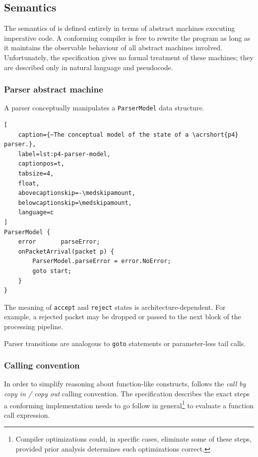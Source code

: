 \subsection{Semantics}

The semantics of \pfs is defined entirely in terms of abstract machines
executing imperative code. A conforming compiler is free to rewrite the \pfs
program as long as it maintains the observable behaviour of all abstract
machines involved. Unfortunately, the specification gives no formal treatment
of these machines; they are described only in natural language and pseudocode.



\subsubsection*{Parser abstract machine}

A parser conceptually manipulates a \texttt{ParserModel} data structure.

\begin{lstlisting}[
	caption={~The conceptual model of the state of a \acrshort{p4} parser.},
	label=lst:p4-parser-model,
	captionpos=t,
	tabsize=4,
	float,
	abovecaptionskip=-\medskipamount,
	belowcaptionskip=\medskipamount,
	language=c
]
ParserModel {
    error       parseError;
    onPacketArrival(packet p) {
        ParserModel.parseError = error.NoError;
        goto start;
    }
}
\end{lstlisting}

The meaning of \texttt{accept} and \texttt{reject} states is
architecture-dependent. For example, a rejected packet may be dropped or
passed to the next block of the processing pipeline.

Parser transitions are analogous to \texttt{goto} statements or parameter-less
tail calls.

\subsubsection*{Calling convention}

In order to simplify reasoning about function-like constructs, \pfs follows the
\emph{call by copy in / copy out} calling convention. The specification
describes the exact steps a conforming implementation needs to go follow in
general\footnote{Compiler optimizations could, in specific cases, eliminate some
of these steps, provided prior analysis determines such optimizations correct.}
to evaluate a function call expression.

